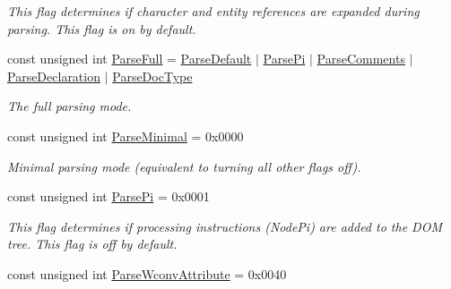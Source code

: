 \begin{DoxyCompactItemize}
\begin{DoxyCompactList}\small\item\em This flag determines if character and entity references are expanded during parsing. This flag is on by default. \item\end{DoxyCompactList}\item 
const unsigned int \hyperlink{namespaceMezzanine_1_1xml_a14a1b1a8836c431265e35c5bbc60655d}{ParseFull} = \hyperlink{namespaceMezzanine_1_1xml_a0eb617274d4b3cb604f3120bcdaf9850}{ParseDefault} $|$ \hyperlink{namespaceMezzanine_1_1xml_ab7885d16db7e01d710dffb803fc9a896}{ParsePi} $|$ \hyperlink{namespaceMezzanine_1_1xml_af7f6768222908469cd315b24c4095f4f}{ParseComments} $|$ \hyperlink{namespaceMezzanine_1_1xml_a642e0534edcb90c314a3767941077cd0}{ParseDeclaration} $|$ \hyperlink{namespaceMezzanine_1_1xml_aea8775764346a3988ca2aef15beecd5e}{ParseDocType}
\begin{DoxyCompactList}\small\item\em The full parsing mode. \item\end{DoxyCompactList}\item 
const unsigned int \hyperlink{namespaceMezzanine_1_1xml_a019444c8f75908387adc214812b1f5ef}{ParseMinimal} = 0x0000
\begin{DoxyCompactList}\small\item\em Minimal parsing mode (equivalent to turning all other flags off). \item\end{DoxyCompactList}\item 
\hypertarget{namespaceMezzanine_1_1xml_ab7885d16db7e01d710dffb803fc9a896}{
const unsigned int \hyperlink{namespaceMezzanine_1_1xml_ab7885d16db7e01d710dffb803fc9a896}{ParsePi} = 0x0001}
\label{namespaceMezzanine_1_1xml_ab7885d16db7e01d710dffb803fc9a896}

\begin{DoxyCompactList}\small\item\em This flag determines if processing instructions (NodePi) are added to the DOM tree. This flag is off by default. \item\end{DoxyCompactList}\item 
\hypertarget{namespaceMezzanine_1_1xml_a9e9a386f6a2e7dac28df4b581d8f49b3}{
const unsigned int \hyperlink{namespaceMezzanine_1_1xml_a9e9a386f6a2e7dac28df4b581d8f49b3}{ParseWconvAttribute} = 0x0040}
\label{namespaceMezzanine_1_1xml_a9e9a386f6a2e7dac28df4b581d8f49b3}


\end{DoxyCompactItemize}
